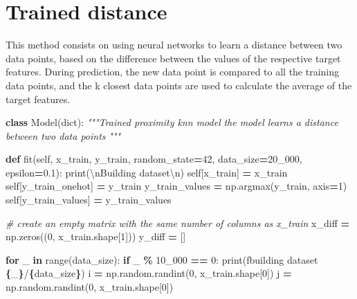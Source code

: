 \documentclass[
]{article}
\newenvironment{Shaded}{\begin{snugshade}}{\end{snugshade}}
\newcommand{\BuiltInTok}[1]{#1}
\newcommand{\CharTok}[1]{\textcolor[rgb]{0.31,0.60,0.02}{#1}}
\newcommand{\CommentTok}[1]{\textcolor[rgb]{0.56,0.35,0.01}{\textit{#1}}}
\newcommand{\ControlFlowTok}[1]{\textcolor[rgb]{0.13,0.29,0.53}{\textbf{#1}}}
\newcommand{\DecValTok}[1]{\textcolor[rgb]{0.00,0.00,0.81}{#1}}
\newcommand{\FloatTok}[1]{\textcolor[rgb]{0.00,0.00,0.81}{#1}}
\newcommand{\KeywordTok}[1]{\textcolor[rgb]{0.13,0.29,0.53}{\textbf{#1}}}
\newcommand{\NormalTok}[1]{#1}
\newcommand{\OperatorTok}[1]{\textcolor[rgb]{0.81,0.36,0.00}{\textbf{#1}}}
\newcommand{\SpecialCharTok}[1]{\textcolor[rgb]{0.81,0.36,0.00}{\textbf{#1}}}
\newcommand{\SpecialStringTok}[1]{\textcolor[rgb]{0.31,0.60,0.02}{#1}}
\newcommand{\StringTok}[1]{\textcolor[rgb]{0.31,0.60,0.02}{#1}}
\newcommand{\VariableTok}[1]{\textcolor[rgb]{0.00,0.00,0.00}{#1}}
\begin{document}
\section{Trained distance}\label{trained-distance}

This method consists on using neural networks to learn a distance
between two data points, based on the difference between the values of
the respective target features. During prediction, the new data point is
compared to all the training data points, and the k closest data points
are used to calculate the average of the target features.

\begin{Shaded}
\begin{Highlighting}[]

\KeywordTok{class}\NormalTok{ Model(}\BuiltInTok{dict}\NormalTok{):}
    \CommentTok{"""Trained proximity knn model}
\CommentTok{    the model learns a distance between two data points}
\CommentTok{    """}

    \KeywordTok{def}\NormalTok{ fit(}\VariableTok{self}\NormalTok{, x\_train, y\_train, }
\NormalTok{            random\_state}\OperatorTok{=}\DecValTok{42}\NormalTok{, data\_size}\OperatorTok{=}\DecValTok{20\_000}\NormalTok{, epsilon}\OperatorTok{=}\FloatTok{0.1}\NormalTok{):}
        \BuiltInTok{print}\NormalTok{(}\StringTok{\textquotesingle{}}\CharTok{\textbackslash{}n}\StringTok{Building dataset}\CharTok{\textbackslash{}n}\StringTok{\textquotesingle{}}\NormalTok{)}
        \VariableTok{self}\NormalTok{[}\StringTok{\textquotesingle{}x\_train\textquotesingle{}}\NormalTok{] }\OperatorTok{=}\NormalTok{ x\_train}
        \VariableTok{self}\NormalTok{[}\StringTok{\textquotesingle{}y\_train\_onehot\textquotesingle{}}\NormalTok{] }\OperatorTok{=}\NormalTok{ y\_train}
\NormalTok{        y\_train\_values }\OperatorTok{=}\NormalTok{ np.argmax(y\_train, axis}\OperatorTok{=}\DecValTok{1}\NormalTok{)}
        \VariableTok{self}\NormalTok{[}\StringTok{\textquotesingle{}y\_train\_values\textquotesingle{}}\NormalTok{] }\OperatorTok{=}\NormalTok{ y\_train\_values}

        \CommentTok{\# create an empty matrix with the same number of columns as x\_train}
\NormalTok{        x\_diff }\OperatorTok{=}\NormalTok{ np.zeros((}\DecValTok{0}\NormalTok{, x\_train.shape[}\DecValTok{1}\NormalTok{]))}
\NormalTok{        y\_diff }\OperatorTok{=}\NormalTok{ []}

        \ControlFlowTok{for}\NormalTok{ \_ }\KeywordTok{in} \BuiltInTok{range}\NormalTok{(data\_size):}
            \ControlFlowTok{if}\NormalTok{ \_ }\OperatorTok{\%} \DecValTok{10\_000} \OperatorTok{==} \DecValTok{0}\NormalTok{:}
                \BuiltInTok{print}\NormalTok{(}\SpecialStringTok{f\textquotesingle{}building dataset }\SpecialCharTok{\{}\NormalTok{\_}\SpecialCharTok{\}}\SpecialStringTok{/}\SpecialCharTok{\{}\NormalTok{data\_size}\SpecialCharTok{\}}\SpecialStringTok{\textquotesingle{}}\NormalTok{)}
\NormalTok{            i }\OperatorTok{=}\NormalTok{ np.random.randint(}\DecValTok{0}\NormalTok{, x\_train.shape[}\DecValTok{0}\NormalTok{])}
\NormalTok{            j }\OperatorTok{=}\NormalTok{ np.random.randint(}\DecValTok{0}\NormalTok{, x\_train.shape[}\DecValTok{0}\NormalTok{])}


\end{Highlighting}
\end{Shaded}
\end{document}
